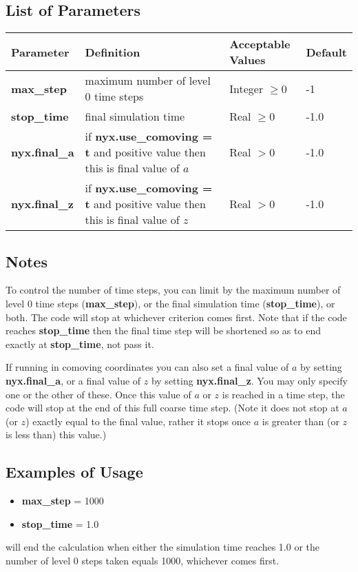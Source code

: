 \subsection{List of Parameters}
\begin{table*}[h]
\begin{scriptsize}
\begin{center}
\begin{tabular}{|l|l|l|l|} \hline
Parameter & Definition & Acceptable Values &Default \\
\hline
{\bf max\_step}  & maximum number of level 0 time steps & Integer $\geq 0$ & -1 \\
{\bf stop\_time} & final simulation time & Real $\geq 0$ & -1.0 \\
{\bf nyx.final\_a}   & if {\bf nyx.use\_comoving = t} and positive value then this is final value of $a$  & Real $> 0$ & -1.0 \\
{\bf nyx.final\_z}   & if {\bf nyx.use\_comoving = t} and positive value then this is final value of $z$  & Real $> 0$ & -1.0 \\
\hline
\end{tabular}
\label{Table:TimeInputs}
\end{center}
\end{scriptsize}
\end{table*}

\subsection{Notes}
To control the number of time steps, you can limit by the maximum number of 
level 0 time steps ({\bf max\_step}), or the final simulation time ({\bf stop\_time}), 
or both. The code will stop at whichever criterion comes first. 
Note that if the code reaches {\bf stop\_time} then the final time step will be shortened so as to end 
exactly at {\bf stop\_time}, not pass it.

If running in comoving coordinates you can also set 
a final value of $a$ by setting {\bf nyx.final\_a}, 
or a final value of $z$ by setting {\bf nyx.final\_z}.
You may only specify one or the other of these.
Once this value of $a$ or $z$ is reached in a time step, 
the code will stop at the end of this full coarse time step.  
(Note it does not stop at $a$ (or $z$) exactly equal to the final value, 
rather it stops once $a$ is greater than (or $z$ is less than) this value.)


\subsection{Examples of Usage}
\begin{itemize}
\item {\bf max\_step}  = 1000
\item {\bf stop\_time}  = 1.0
\end{itemize}
will end the calculation when either the simulation time reaches 1.0 or 
the number of level 0 steps taken equals 1000, whichever comes first.


